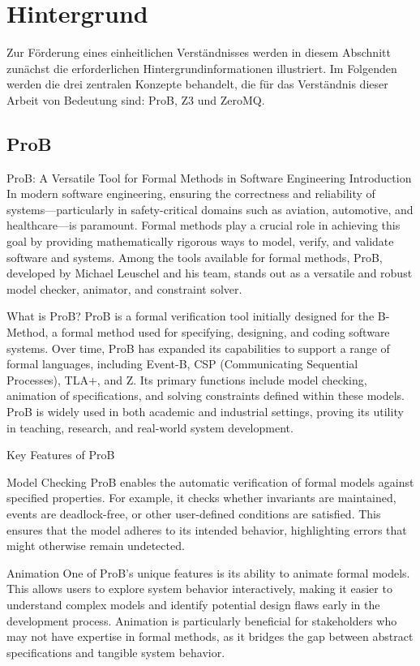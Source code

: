 

\section{Hintergrund}

Zur Förderung eines einheitlichen Verständnisses werden in diesem Abschnitt zunächst die erforderlichen Hintergrundinformationen illustriert.
Im Folgenden werden die drei zentralen Konzepte behandelt, die für das Verständnis dieser Arbeit von Bedeutung sind: ProB, Z3 und ZeroMQ.

\subsection{ProB}
\cite{10.1007/978-3-540-45236-2_46}


ProB: A Versatile Tool for Formal Methods in Software Engineering
Introduction
In modern software engineering, ensuring the correctness and reliability of systems—particularly in safety-critical domains such as aviation, automotive, and healthcare—is paramount. Formal methods play a crucial role in achieving this goal by providing mathematically rigorous ways to model, verify, and validate software and systems. Among the tools available for formal methods, ProB, developed by Michael Leuschel and his team, stands out as a versatile and robust model checker, animator, and constraint solver.

What is ProB?
ProB is a formal verification tool initially designed for the B-Method, a formal method used for specifying, designing, and coding software systems. Over time, ProB has expanded its capabilities to support a range of formal languages, including Event-B, CSP (Communicating Sequential Processes), TLA+, and Z. Its primary functions include model checking, animation of specifications, and solving constraints defined within these models. ProB is widely used in both academic and industrial settings, proving its utility in teaching, research, and real-world system development.

Key Features of ProB

Model Checking
ProB enables the automatic verification of formal models against specified properties. For example, it checks whether invariants are maintained, events are deadlock-free, or other user-defined conditions are satisfied. This ensures that the model adheres to its intended behavior, highlighting errors that might otherwise remain undetected.

Animation
One of ProB’s unique features is its ability to animate formal models. This allows users to explore system behavior interactively, making it easier to understand complex models and identify potential design flaws early in the development process. Animation is particularly beneficial for stakeholders who may not have expertise in formal methods, as it bridges the gap between abstract specifications and tangible system behavior.

